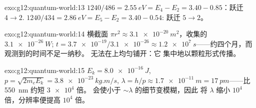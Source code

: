 \begin{solution}{exo:g12:quantum-world:13}
$1240/486 = \qty{2.55}{eV} = E_4 - E_2 = 3.40 - 0.85$：跃迁
$4 \to 2$. $1240/434 = \qty{2.86}{eV} = E_5 - E_2 = 3.40 - 0.54$:
跃迁 $5 \to 2$。
\end{solution}

\begin{solution}{exo:g12:quantum-world:14}
横截面 $\pi r^2 \approx \qty{3.1e-20}{m^2}$，收集的
$\qty{3.1e-26}{W}$; $t = \num{3.7e-19}/\num{3.1e-26} \approx
\qty{1.2e7}{s}$——约四个月，而观测到的时间不足一纳秒。
无法在上均匀铺开：它
集中地以颗粒形式传播。
\end{solution}

\begin{solution}{exo:g12:quantum-world:15}
$E_k = \qty{8.0e-16}{J}$, $p = \sqrt{2m_e E_k} =
\qty{3.8e-23}{kg.m/s}$, $\lambda = h/p \approx \qty{1.7e-11}{m} =
\qty{17}{pm}$——比 \qty{550}{nm} 约短 $\num{3e4}$ 倍。
会使小于 $\sim\lambda$ 的细节变模糊，因此
将 $\lambda$ 缩小 $10^4$ 倍，分辨率便提高 $10^4$ 倍。
\end{solution}


